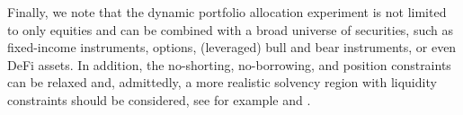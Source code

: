 Finally, we note that the dynamic portfolio allocation experiment is not limited to only equities and can be combined with a broad universe of securities, such as fixed-income instruments, options, (leveraged) bull and bear instruments, or even DeFi assets. In addition, the no-shorting, no-borrowing, and position constraints can be relaxed and, admittedly, a more realistic solvency region with liquidity constraints should be considered, see for example \textcite{ly2007model} and \textcite{frey2010optimal}.
